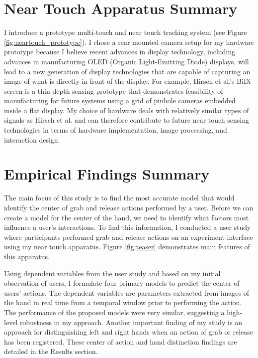 \section{Near Touch Apparatus Summary}
I introduce a prototype multi-touch and near touch tracking system (see Figure \ref{fig:neartouch_prototype}).  
I chose a rear mounted camera setup for my hardware prototype because I believe recent advances in display technology, including advances in manufacturing OLED (Organic Light-Emitting Diode) displays, will lead to a new generation of display technologies that are capable of capturing an image of what is directly in front of the display.  
For example, Hirsch et al.'s \cite{Hirsch:2009:BIDI} BiDi screen is a thin depth sensing prototype that demonstrates feasibility of manufacturing for future systems using a grid of pinhole cameras embedded inside a flat display.  
My choice of hardware deals with relatively similar types of signals as Hirsch et al. and can therefore contribute to future near touch sensing technologies in terms of hardware implementation, image processing, and interaction design.

\section{Empirical Findings Summary}
The main focus of this study is to find the most accurate model that would identify the center of grab and release actions performed by a user.  
Before we can create a model for the center of the hand, we need to identify what factors most influence a user's interactions.  
To find this information, I conducted a user study where participants performed grab and release actions on an experiment interface using my near touch apparatus. Figure \ref{fig:teaser} demonstrates main features of this apparatus.

Using dependent variables from the user study and based on my initial observation of users, I formulate four primary models to predict the center of users' actions.
The dependent variables are parameters extracted from images of the hand in real time from a temporal window prior to performing the action. 
The performance of the proposed models were very similar, suggesting a high-level robustness in my approach.  
Another important finding of my study is an approach for distinguishing left and right hands when an action of grab or release has been registered.  
These center of action and hand distinction findings are detailed in the Results section.

